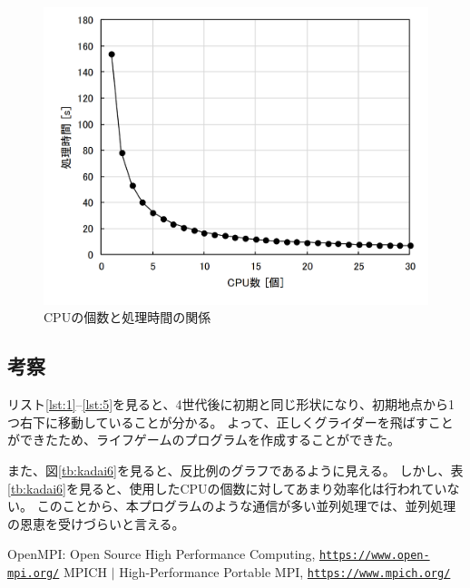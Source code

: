 \documentclass[a4j,titlepage]{jsarticle}
\begin{document}
\begin{figure}[H]
  \centering
  \includegraphics[width=12cm]{./MPI/kadai06-result/kadai06.png}
  \caption{CPUの個数と処理時間の関係}
  \label{fig:kadai6}
\end{figure}

\subsection{考察}
リスト\ref{lst:1}--\ref{lst:5}を見ると、4世代後に初期と同じ形状になり、初期地点から1つ右下に移動していることが分かる。
よって、正しくグライダーを飛ばすことができたため、ライフゲームのプログラムを作成することができた。

また、図\ref{tb:kadai6}を見ると、反比例のグラフであるように見える。
しかし、表\ref{tb:kadai6}を見ると、使用したCPUの個数に対してあまり効率化は行われていない。
このことから、本プログラムのような通信が多い並列処理では、並列処理の恩恵を受けづらいと言える。


\begin{thebibliography}{9}
   OpenMPI: Open Source High Performance Computing, \texttt{\url{https://www.open-mpi.org/}}
   MPICH $|$ High-Performance Portable MPI, \texttt{\url{https://www.mpich.org/}}
\end{thebibliography}
\end{document}
